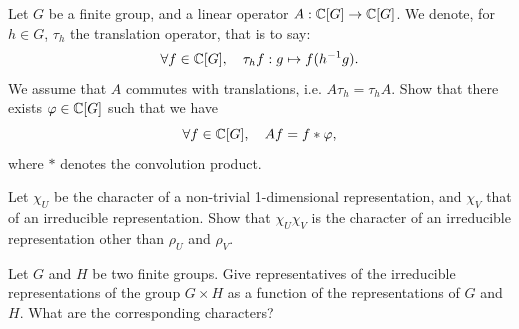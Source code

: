  
\begin{exo}
\label{exo-stationary-operators}
 
  Let $G$ be a finite group, and a linear operator $ A: \mathbb{C} [G] \rightarrow \mathbb{C} [G] $. We denote, for $ h \in G $, $ \tau_h $ the translation operator, that is to say:
\begin{equation*}
\forall f \in \mathbb{C} [G], \quad \tau_h f: g \mapsto f(h^{-1} g).
\end{equation*}
We assume that $ A $ commutes with translations, i.e. $ A \tau_h = \tau_h A $. Show that there exists $ \varphi \in \mathbb{C} [G] $ such that we have
\begin{equation*}
\forall f \in \mathbb{C} [G], \quad A f = f * \varphi,
\end{equation*}
where $ * $ denotes the convolution product.
\end{exo}
 
 
\begin{exo}
\label{exo-irred-representation-degre-1}
 
  Let $ \chi_U $ be the character of a non-trivial 1-dimensional representation, and $ \chi_V $ that of an irreducible representation. Show that $ \chi_U \chi_V $ is the character of an irreducible representation other than $ \rho_U $ and $ \rho_V $.
\end{exo}
 
 
\begin{exo}
\label{exo-representation-product}
 
 Let $G$ and $ H $ be two finite groups. Give representatives of the irreducible representations of the group $ G \times H $ as a function of the representations of $G$ and $ H $. What are the corresponding characters?
\end{exo}
 

